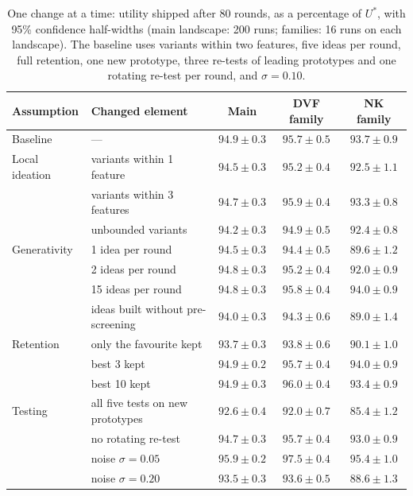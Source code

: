 \documentclass[preprint,review,11pt,authoryear]{elsarticle}
\theoremstyle{definition}
\begin{document}
\begin{table}[t]
\caption{One change at a time: utility shipped after 80 rounds, as a percentage of $U^*$, with 95\% confidence half-widths (main landscape: 200 runs; families: 16 runs on each landscape). The baseline uses variants within two features, five ideas per round, full retention, one new prototype, three re-tests of leading prototypes and one rotating re-test per round, and $\sigma=0.10$.}
\label{tab:ablation}
\centering\footnotesize\setlength{\tabcolsep}{4pt}
\begin{tabular}{@{}llccc@{}}
\toprule
Assumption & Changed element & Main & DVF family & NK family\\
\midrule
Baseline & --- & $94.9\pm0.3$ & $95.7\pm0.5$ & $93.7\pm0.9$\\
\addlinespace[2pt]
Local ideation & variants within 1 feature & $94.5\pm0.3$ & $95.2\pm0.4$ & $92.5\pm1.1$\\
 & variants within 3 features & $94.7\pm0.3$ & $95.9\pm0.4$ & $93.3\pm0.8$\\
 & unbounded variants & $94.2\pm0.3$ & $94.9\pm0.5$ & $92.4\pm0.8$\\
\addlinespace[2pt]
Generativity & 1 idea per round & $94.5\pm0.3$ & $94.4\pm0.5$ & $89.6\pm1.2$\\
 & 2 ideas per round & $94.8\pm0.3$ & $95.2\pm0.4$ & $92.0\pm0.9$\\
 & 15 ideas per round & $94.8\pm0.3$ & $95.8\pm0.4$ & $94.0\pm0.9$\\
 & ideas built without pre-screening & $94.0\pm0.3$ & $94.3\pm0.6$ & $89.0\pm1.4$\\
\addlinespace[2pt]
Retention & only the favourite kept & $93.7\pm0.3$ & $93.8\pm0.6$ & $90.1\pm1.0$\\
 & best 3 kept & $94.9\pm0.2$ & $95.7\pm0.4$ & $94.0\pm0.9$\\
 & best 10 kept & $94.9\pm0.3$ & $96.0\pm0.4$ & $93.4\pm0.9$\\
\addlinespace[2pt]
Testing & all five tests on new prototypes & $92.6\pm0.4$ & $92.0\pm0.7$ & $85.4\pm1.2$\\
 & no rotating re-test & $94.7\pm0.3$ & $95.7\pm0.4$ & $93.0\pm0.9$\\
 & noise $\sigma=0.05$ & $95.9\pm0.2$ & $97.5\pm0.4$ & $95.4\pm1.0$\\
 & noise $\sigma=0.20$ & $93.5\pm0.3$ & $93.6\pm0.5$ & $88.6\pm1.3$\\
\bottomrule
\end{tabular}
\end{table}
\end{document}
